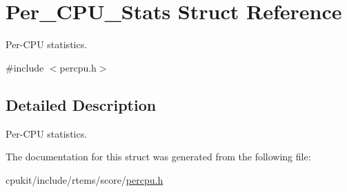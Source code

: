 \hypertarget{structPer__CPU__Stats}{}\section{Per\+\_\+\+C\+P\+U\+\_\+\+Stats Struct Reference}
\label{structPer__CPU__Stats}


Per-\/\+C\+PU statistics.  




{\ttfamily \#include $<$percpu.\+h$>$}



\subsection{Detailed Description}
Per-\/\+C\+PU statistics. 

The documentation for this struct was generated from the following file\+:\begin{DoxyCompactItemize}
\item 
cpukit/include/rtems/score/\mbox{\hyperlink{score_2percpu_8h}{percpu.\+h}}\end{DoxyCompactItemize}
